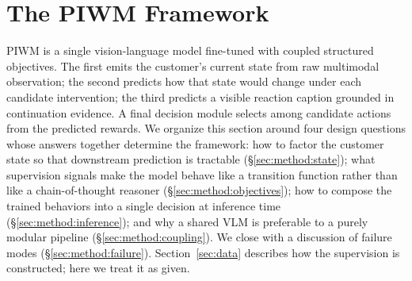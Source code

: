 \documentclass{article}
\begin{document}

\section{The PIWM Framework}
\label{sec:method}

PIWM is a single vision-language model fine-tuned with coupled structured objectives. The first emits the customer's current state from raw multimodal observation; the second predicts how that state would change under each candidate intervention; the third predicts a visible reaction caption grounded in continuation evidence. A final decision module selects among candidate actions from the predicted rewards. We organize this section around four design questions whose answers together determine the framework: how to factor the customer state so that downstream prediction is tractable (§\ref{sec:method:state}); what supervision signals make the model behave like a transition function rather than like a chain-of-thought reasoner (§\ref{sec:method:objectives}); how to compose the trained behaviors into a single decision at inference time (§\ref{sec:method:inference}); and why a shared VLM is preferable to a purely modular pipeline (§\ref{sec:method:coupling}). We close with a discussion of failure modes (§\ref{sec:method:failure}). Section~\ref{sec:data} describes how the supervision is constructed; here we treat it as given.
\end{document}
